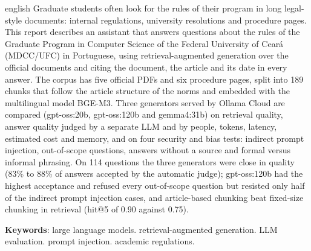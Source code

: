 \documentclass[12pt,openright,oneside,a4paper,english,brazil]{abntex2}
\begin{document}
\begin{resumo}[Abstract]
\begin{otherlanguage*}{english}
Graduate students often look for the rules of their program in long legal-style
documents: internal regulations, university resolutions and procedure pages.
This report describes an assistant that answers questions about the rules of the
Graduate Program in Computer Science of the Federal University of Ceará (MDCC/UFC)
in Portuguese, using retrieval-augmented generation over the official documents and
citing the document, the article and its date in every answer. The corpus has five
official PDFs and six procedure pages, split into 189 chunks that follow the article
structure of the norms and embedded with the multilingual model BGE-M3. Three
generators served by Ollama Cloud are compared (gpt-oss:20b, gpt-oss:120b and
gemma4:31b) on retrieval quality, answer quality judged by a separate LLM and by
people, tokens, latency, estimated cost and memory, and on four security and bias
tests: indirect prompt injection, out-of-scope questions, answers without a source and
formal versus informal phrasing. On 114 questions the three generators were close in quality (83\% to 88\% of answers accepted by the automatic judge); gpt-oss:120b had the highest acceptance and refused every out-of-scope question but resisted only half of the indirect prompt injection cases, and article-based chunking beat fixed-size chunking in retrieval (hit@5 of 0.90 against 0.75).

\textbf{Keywords}: large language models. retrieval-augmented generation. LLM
evaluation. prompt injection. academic regulations.
\end{otherlanguage*}
\end{resumo}

\listoffigures*
\cleardoublepage
{}
\listoftables*
\cleardoublepage
{}
\tableofcontents*
\cleardoublepage

\textual








\postextual


\end{document}
